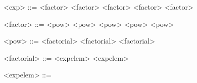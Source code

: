 \begin{grammarEx}
	<exp> ::= <factor> \lit{+} <factor>
	\alt <factor> \lit{-} <factor>
	\alt <factor>

	<factor> ::= <pow> \lit{*} <pow>
	\alt <pow> \lit{/} <pow>
	\alt <pow>

	<pow> ::= <factorial> \lit{\^{}} <factorial>
	\alt <factorial>

	<factorial> ::= <exp\textunderscore elem> \lit{!}
	\alt <exp\textunderscore elem>

	<exp\textunderscore elem> ::= 
	\alt {}
\end{grammarEx}